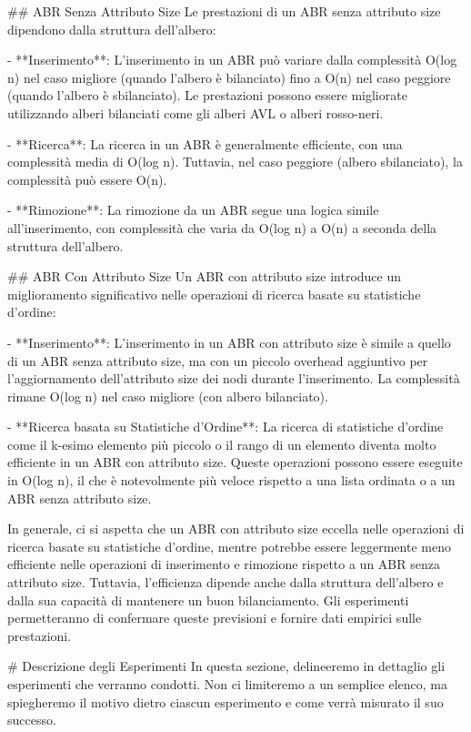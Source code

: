 \documentclass[twocolumn]{article}
\begin{document}
\begin{markdown}
## ABR Senza Attributo Size
Le prestazioni di un ABR senza attributo size dipendono dalla struttura dell'albero:

- **Inserimento**: L'inserimento in un ABR può variare dalla complessità O(log n) nel caso migliore (quando l'albero è bilanciato) fino a O(n) nel caso peggiore (quando l'albero è sbilanciato). Le prestazioni possono essere migliorate utilizzando alberi bilanciati come gli alberi AVL o alberi rosso-neri.
  
- **Ricerca**: La ricerca in un ABR è generalmente efficiente, con una complessità media di O(log n). Tuttavia, nel caso peggiore (albero sbilanciato), la complessità può essere O(n).
  
- **Rimozione**: La rimozione da un ABR segue una logica simile all'inserimento, con complessità che varia da O(log n) a O(n) a seconda della struttura dell'albero.

## ABR Con Attributo Size
Un ABR con attributo size introduce un miglioramento significativo nelle operazioni di ricerca basate su statistiche d'ordine:

- **Inserimento**: L'inserimento in un ABR con attributo size è simile a quello di un ABR senza attributo size, ma con un piccolo overhead aggiuntivo per l'aggiornamento dell'attributo size dei nodi durante l'inserimento. La complessità rimane O(log n) nel caso migliore (con albero bilanciato).
  
- **Ricerca basata su Statistiche d'Ordine**: La ricerca di statistiche d'ordine come il k-esimo elemento più piccolo o il rango di un elemento diventa molto efficiente in un ABR con attributo size. Queste operazioni possono essere eseguite in O(log n), il che è notevolmente più veloce rispetto a una lista ordinata o a un ABR senza attributo size.

In generale, ci si aspetta che un ABR con attributo size eccella nelle operazioni di ricerca basate su statistiche d'ordine, mentre potrebbe essere leggermente meno efficiente nelle operazioni di inserimento e rimozione rispetto a un ABR senza attributo size. Tuttavia, l'efficienza dipende anche dalla struttura dell'albero e dalla sua capacità di mantenere un buon bilanciamento. Gli esperimenti permetteranno di confermare queste previsioni e fornire dati empirici sulle prestazioni.

# Descrizione degli Esperimenti
In questa sezione, delineeremo in dettaglio gli esperimenti che verranno condotti. Non ci limiteremo a un semplice elenco, ma spiegheremo il motivo dietro ciascun esperimento e come verrà misurato il suo successo.


\end{markdown}
\end{document}
